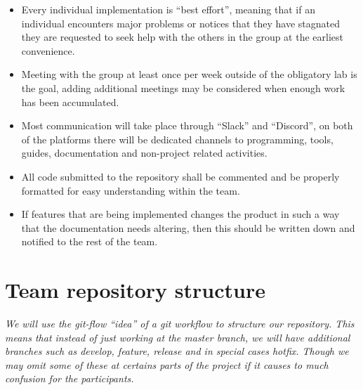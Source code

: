 \documentclass[12pt]{article}%
\begin{document}
\begin{itemize}
\item Every individual implementation is “best effort”, meaning that if an individual encounters major problems or notices that they have stagnated they are requested to seek help with the others in the group at the earliest convenience.
\item Meeting with the group at least once per week outside of the obligatory lab is the goal, adding additional meetings may be considered when enough work has been accumulated.
\item Most communication will take place through “Slack” and “Discord”, on both of the platforms there will be dedicated channels to programming, tools, guides, documentation and non-project related activities.
\item All code submitted to the repository shall be commented and be properly formatted for easy understanding within the team.
\item If features that are being implemented changes the product in such a way that the documentation needs altering, then this should be written down and notified to the rest of the team.
\end{itemize}


\section{Team repository structure}

\textit{We will use the git-flow “idea” of a git workflow to structure our repository. This means that instead of just working at the master branch, we will have additional branches such as develop, feature, release and in special cases hotfix. Though we may omit some of these at certains parts of the project if it causes to much confusion for the participants.}
\vspace{5mm} %
\end{document}

